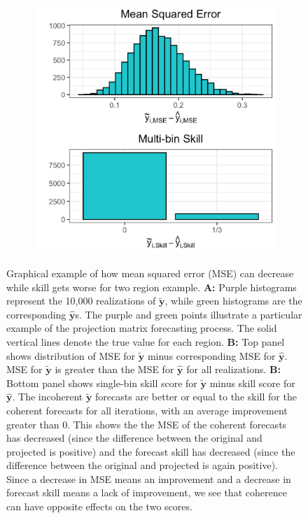 \documentclass{umassthesis}          %
\begin{document}
\begin{figure}
\begin{subfigure}{.5\textwidth}
    \includegraphics[scale=.4]{cmse_ex1.png}
    \caption{}
\end{subfigure}%

    \caption{Graphical example of how mean squared error (MSE) can decrease while skill gets worse for two region example. \textbf{A:} Purple histograms represent the 10,000 realizations of $\bm{\tilde{y}}$, while green histograms are the corresponding $\bm{\hat{y}}$s. The purple and green points illustrate a particular example of the projection matrix forecasting process. The solid vertical lines denote the true value for each region. \textbf{B:} Top panel shows distribution of MSE for $\bm{\tilde{y}}$ minus corresponding MSE for $\bm{\hat{y}}$. MSE for $\bm{\tilde{y}}$ is greater than the MSE for $\bm{\hat{y}}$ for all realizations. \textbf{B:} Bottom panel shows single-bin skill score for $\bm{\tilde{y}}$ minus skill score for $\bm{\hat{y}}$. The incoherent $\bm{\tilde{y}}$ forecasts are better or equal to the skill for the coherent forecasts for all iterations, with an average improvement greater than 0. This shows the the MSE of the coherent forecasts has decreased (since the difference between the original and projected is positive) and the forecast skill has decreased (since the difference between the original and projected is again positive). Since a decrease in MSE means an improvement and a decrease in forecast skill means a lack of improvement, we see that coherence can have opposite effects on the two scores.  }
    \label{fig:my_label}
\end{figure}
\end{document}
